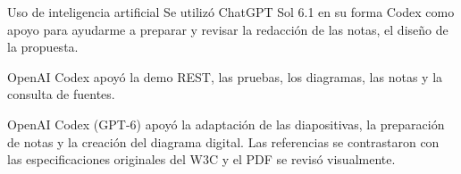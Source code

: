 \documentclass[aspectratio=169,11pt]{beamer}
\begin{document}
\begin{frame}[noframenumbering]{Uso de inteligencia artificial}
Se utilizó ChatGPT Sol 6.1 en su forma Codex como apoyo para ayudarme a preparar y revisar la redacción de las notas, el diseño de la propuesta.
\par\medskip
{}
OpenAI Codex apoyó la demo REST, las pruebas, los diagramas, las notas y la consulta de fuentes.
\par\medskip
{}
OpenAI Codex (GPT-6) apoyó la adaptación de las diapositivas, la preparación de notas y la creación del diagrama digital. Las referencias se contrastaron con las especificaciones originales del W3C y el PDF se revisó visualmente.
\end{frame}
\end{document}

